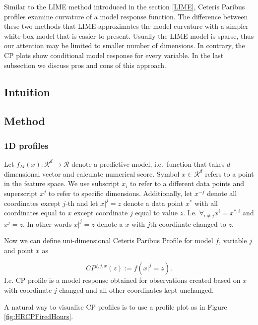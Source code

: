 \documentclass[]{krantz}
\theoremstyle{definition}
\theoremstyle{definition}
\theoremstyle{definition}
\theoremstyle{remark}
\begin{document}
Similar to the LIME method introduced in the section \ref{LIME}, Ceteris
Paribus profiles examine curvature of a model response function. The
difference between these two methods that LIME approximates the model
curvature with a simpler white-box model that is easier to present.
Usually the LIME model is sparse, thus our attention may be limited to
smaller number of dimensions. In contrary, the CP plots show conditional
model response for every variable. In the last subsection we discuss
pros and cons of this approach.

\hypertarget{intuition-5}{%
\subsection{Intuition}\label{intuition-5}}

\hypertarget{method-5}{%
\subsection{Method}\label{method-5}}

\hypertarget{ceterisParibus1d}{%
\subsubsection{1D profiles}\label{ceterisParibus1d}}

Let \(f_{M}(x): \mathcal R^{d} \rightarrow \mathcal R\) denote a
predictive model, i.e.~function that takes \(d\) dimensional vector and
calculate numerical score. Symbol \(x \in \mathcal R^d\) refers to a
point in the feature space. We use subscript \(x_i\) to refer to a
different data points and superscript \(x^j\) to refer to specific
dimensions. Additionally, let \(x^{-j}\) denote all coordinates except
\(j\)-th and let \(x|^j=z\) denote a data point \(x^*\) with all
coordinates equal to \(x\) except coordinate \(j\) equal to value \(z\).
I.e. \(\forall_{i \neq {j}} x^i = x^{*,i}\) and \(x^j = z\). In other
words \(x|^j=z\) denote a \(x\) with \(j\)th coordinate changed to
\(z\).

Now we can define uni-dimensional Ceteris Paribus Profile for model
\(f\), variable \(j\) and point \(x\) as

\[
CP^{f, j, x}(z) := f(x|^j = z).
\] I.e. CP profile is a model response obtained for observations created
based on \(x\) with coordinate \(j\) changed and all other coordinates
kept unchanged.

A natural way to visualise CP profiles is to use a profile plot as in
Figure \ref{fig:HRCPFiredHours}.
\end{document}
